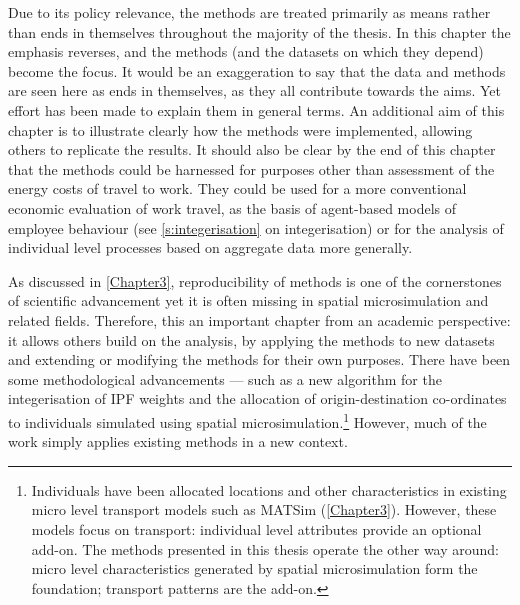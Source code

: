 \documentclass[a4paper, 11pt, twoside]{Thesis}
\begin{document}
Due to its policy relevance, the methods 
are treated primarily as means rather than ends in themselves throughout
the majority of the thesis. In this chapter the emphasis reverses, and the methods
(and the datasets on which they depend) become the focus. It would be an
exaggeration to say that the data and
methods are seen here as ends in themselves, as they all contribute towards the
aims. Yet effort has been made to explain them in general terms. An
additional aim of this chapter is to illustrate clearly how the methods
were implemented, allowing others to replicate the results. It should also be
clear by the end of this chapter that the methods could be harnessed for
purposes other than assessment
of the energy costs of travel to work. They could be used
for a more conventional economic evaluation of work travel, as the basis of
agent-based models of employee behaviour (see
\cref{s:integerisation} on integerisation) or for the analysis
of individual level processes based on aggregate data more generally.

As discussed in \cref{Chapter3}, reproducibility of methods is one of the
cornerstones
of scientific advancement yet it is often missing in spatial microsimulation and
related fields. Therefore, this an important chapter from an academic perspective:
it allows others build on the analysis, by applying the methods to new datasets
and extending or modifying the methods for their own purposes. 
There have been some methodological advancements ---
such as a new algorithm for the integerisation of IPF weights and
the allocation of origin-destination co-ordinates to individuals
simulated using spatial
microsimulation.\footnote{Individuals
have been allocated locations and other characteristics in
existing micro level transport models such as
MATSim (\cref{Chapter3}). However, these models focus on transport:
individual level attributes provide an optional add-on.
The methods presented in this thesis operate the other
way around: micro level characteristics generated by spatial microsimulation
form the foundation; transport patterns are the add-on.
}
However, much of the work simply applies existing methods in a
new context.
\end{document}
